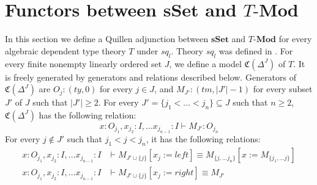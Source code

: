 \documentclass[reqno]{amsart}
\theoremstyle{definition}
\theoremstyle{remark}
\newcommand{\deq}{\equiv}
\newcommand{\repl}{:=}
\newcommand{\cat}[1]{\mathbf{#1}}
\newcommand{\Cat}{\cat{Cat}}
\newcommand{\Mod}[1]{#1\text{-}\cat{Mod}}
\newcommand{\sSet}{\cat{sSet}}
\newcommand{\Hom}{\mathrm{Hom}}
\numberwithin{figure}{section}
\begin{document}
\begin{comment}
There is a pair of adjoint functors $\mathfrak{C}_\Delta : \sSet \rightleftarrows \Cat_\Delta : N_\Delta$ which is defined in \cite[Section~1.1.5]{lurie-topos}.
We will need analogous functors for cubically enriched categories.
We define a cubically enriched category $\mathfrak{C}_\square(\Delta^n)$ as follows:
\begin{itemize}
\item The objects of $\mathfrak{C}_\square(\Delta^n)$ are natural numbers between $0$ and $n$.
\item For every $0 \leq j < i \leq n$, $\Hom_{\mathfrak{C}_\square(\Delta^n)}(i,j) = \varnothing$.
\item For every $0 \leq i \leq n$, $\Hom_{\mathfrak{C}_\square(\Delta^n)}(i,i) = 1$.
\item For every $0 \leq i < j \leq n$, $\Hom_{\mathfrak{C}_\square(\Delta^n)}(i,j) = \square^{j-i-1}$.
\item For every object $i$ of $\mathfrak{C}_\square(\Delta^n)$, the identity morphism on $i$ is the unique element of $\Hom_{\mathfrak{C}_\square(\Delta^n)}(i,i)$.
\item For every $0 \leq i < j < k \leq n$, the composition
\[ \Hom_{\mathfrak{C}_\square(\Delta^n)}(i,j) \otimes \Hom_{\mathfrak{C}_\square(\Delta^n)}(j,k) \to \Hom_{\mathfrak{C}_\square(\Delta^n)}(i,k) \]
is the composite $\square^{j-i-1} \otimes \square^{k-j-1} \cong \square^{k-i-2} \to \square^{k-i-1}$.
\end{itemize}
\end{comment}

\section{Functors between $\sSet$ and $\Mod{T}$}

In this section we define a Quillen adjunction between $\sSet$ and $\Mod{T}$ for every algebraic dependent type theory $T$ under $sq_l$.
Theory $sq_l$ was defined in \cite{alg-models}.
For every finite nonempty linearly ordered set $J$, we define a model $\mathfrak{C}(\Delta^J)$ of $T$.
It is freely generated by generators and relations described below.
Generators of $\mathfrak{C}(\Delta^J)$ are $O_j : (ty,0)$ for every $j \in J$, and $M_{J'} : (tm,|J'|-1)$ for every subset $J'$ of $J$ such that $|J'| \geq 2$.
For every $J' = \{ j_1 < \ldots < j_n \} \subseteq J$ such that $n \geq 2$, $\mathfrak{C}(\Delta^J)$ has the following relation:
\[ x : O_{j_1}, x_{j_2} : I, \ldots x_{j_{n-1}} : I \vdash M_{J'} : O_{j_n} \]
For every $j \notin J'$ such that $j_1 < j < j_n$, it has the following relations:
\begin{align}
x : O_{j_1}, x_{j_2} : I, \ldots x_{j_{n-1}} : I & \vdash M_{J' \cup \{j\}}[x_j \repl left] \deq M_{\{ j, \ldots j_n \}}[x \repl M_{\{ j_1, \ldots j \}}] \label{rel:left} \\
x : O_{j_1}, x_{j_2} : I, \ldots x_{j_{n-1}} : I & \vdash M_{J' \cup \{j\}}[x_j \repl right] \deq M_{J'} \label{rel:right}
\end{align}
\end{document}
